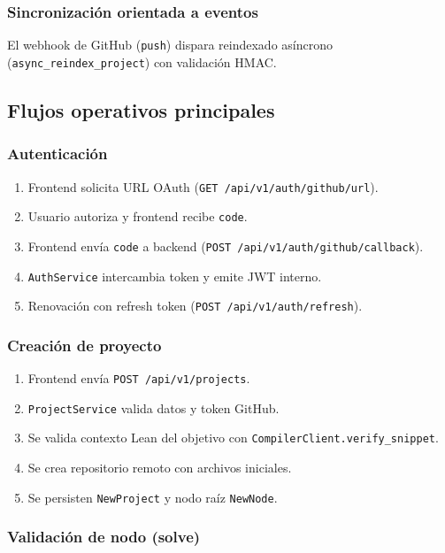\documentclass[12pt, letterpaper]{article}
\begin{document}
\subsubsection{Sincronización orientada a eventos}

El webhook de GitHub (\texttt{push}) dispara reindexado asíncrono (\texttt{async\_reindex\_project}) con validación HMAC.

\subsection{Flujos operativos principales}

\subsubsection{Autenticación}

\begin{enumerate}
    \item Frontend solicita URL OAuth (\texttt{GET /api/v1/auth/github/url}).
    \item Usuario autoriza y frontend recibe \texttt{code}.
    \item Frontend envía \texttt{code} a backend (\texttt{POST /api/v1/auth/github/callback}).
    \item \texttt{AuthService} intercambia token y emite JWT interno.
    \item Renovación con refresh token (\texttt{POST /api/v1/auth/refresh}).
\end{enumerate}

\subsubsection{Creación de proyecto}

\begin{enumerate}
    \item Frontend envía \texttt{POST /api/v1/projects}.
    \item \texttt{ProjectService} valida datos y token GitHub.
    \item Se valida contexto Lean del objetivo con \texttt{CompilerClient.verify\_snippet}.
    \item Se crea repositorio remoto con archivos iniciales.
    \item Se persisten \texttt{NewProject} y nodo raíz \texttt{NewNode}.
\end{enumerate}

\subsubsection{Validación de nodo (solve)}
\end{document}
